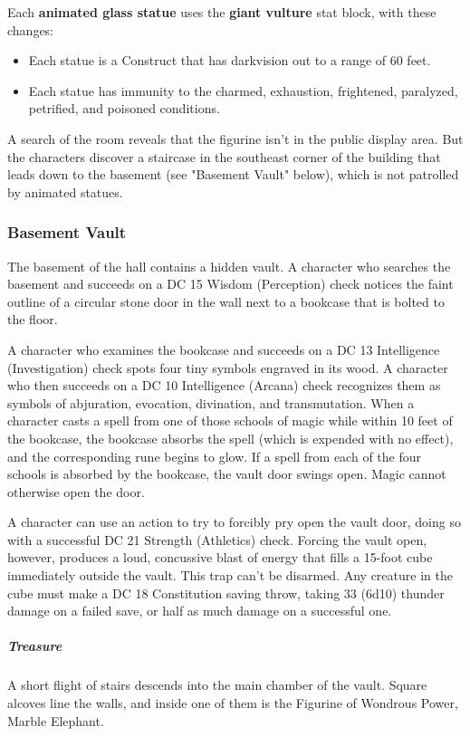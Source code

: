 \documentclass[10pt,a4paper,twoside,fancy,bg=print,twocolumn,openany,nodeprecatedcode]{dndbook}
\begin{document}
Each \textbf{animated glass statue} uses the \textbf{giant vulture} stat block, with these changes:


\begin{itemize}
\item Each statue is a Construct that has darkvision out to a range of 60 feet.
\item Each statue has immunity to the charmed, exhaustion, frightened, paralyzed, petrified, and poisoned conditions.
\end{itemize}

A search of the room reveals that the figurine isn't in the public display area. But the characters discover a staircase in the southeast corner of the building that leads down to the basement (see "Basement Vault" below), which is not patrolled by animated statues.

\subsubsection{Basement Vault}
The basement of the hall contains a hidden vault. A character who searches the basement and succeeds on a DC 15 Wisdom (Perception) check notices the faint outline of a circular stone door in the wall next to a bookcase that is bolted to the floor.

A character who examines the bookcase and succeeds on a DC 13 Intelligence (Investigation) check spots four tiny symbols engraved in its wood. A character who then succeeds on a DC 10 Intelligence (Arcana) check recognizes them as symbols of abjuration, evocation, divination, and transmutation. When a character casts a spell from one of those schools of magic while within 10 feet of the bookcase, the bookcase absorbs the spell (which is expended with no effect), and the corresponding rune begins to glow. If a spell from each of the four schools is absorbed by the bookcase, the vault door swings open. Magic cannot otherwise open the door.

A character can use an action to try to forcibly pry open the vault door, doing so with a successful DC 21 Strength (Athletics) check. Forcing the vault open, however, produces a loud, concussive blast of energy that fills a 15-foot cube immediately outside the vault. This trap can't be disarmed. Any creature in the cube must make a DC 18 Constitution saving throw, taking 33 (6d10) thunder damage on a failed save, or half as much damage on a successful one.

\subparagraph{Treasure}
A short flight of stairs descends into the main chamber of the vault. Square alcoves line the walls, and inside one of them is the Figurine of Wondrous Power, Marble Elephant.
\end{document}
